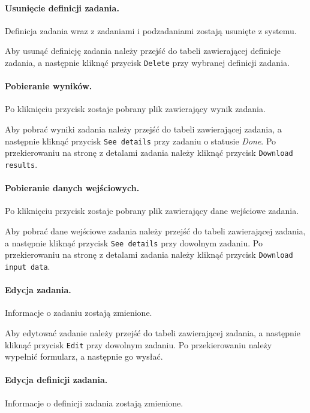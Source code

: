 \documentclass[a4paper,11pt,twoside]{report}
\theoremstyle{definition}
\begin{document}
            \paragraph{Usunięcie definicji zadania.}    
                \noindent Definicja zadania wraz z zadaniami i podzadaniami zostają usunięte z systemu.
                
                Aby usunąć definicję zadania należy przejść do tabeli zawierającej definicje zadania, a następnie kliknąć przycisk \texttt{Delete} przy wybranej definicji zadania. 

            \paragraph{Pobieranie wyników.} 
                \noindent Po kliknięciu przycisk zostaje pobrany plik zawierający
                wynik zadania.
                
                Aby pobrać wyniki zadania należy przejść do tabeli zawierającej zadania, a następnie kliknąć przycisk \texttt{See details} przy zadaniu o statusie \textit{Done}. Po przekierowaniu na stronę z detalami zadania należy kliknąć przycisk \texttt{Download results}.

            \paragraph{Pobieranie danych wejściowych.}  
                \noindent Po kliknięciu przycisk zostaje pobrany plik zawierający dane wejściowe zadania.
                
                Aby pobrać dane wejściowe zadania należy przejść do tabeli zawierającej zadania, a następnie kliknąć przycisk \texttt{See details} przy dowolnym zadaniu. Po przekierowaniu na stronę z detalami zadania należy kliknąć przycisk \texttt{Download input data}.

            \paragraph{Edycja zadania.}  
                \noindent Informacje o zadaniu zostają zmienione.
                
                Aby edytować zadanie należy przejść do tabeli zawierającej zadania, a następnie kliknąć przycisk \texttt{Edit} przy dowolnym zadaniu. Po przekierowaniu należy wypełnić formularz, a następnie go wysłać.

            \paragraph{Edycja definicji zadania.}    
                \noindent Informacje o definicji zadania zostają zmienione.
                
\end{document}
